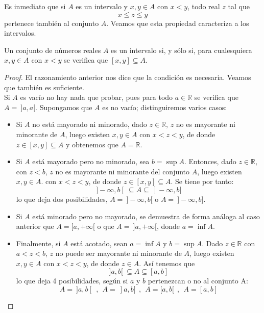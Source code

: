 Es inmediato que si $A$ es un intervalo y $x,y \in A$ con $x < y$, todo real $z$ tal que
\begin{equation*}
    x \leq z \leq y
\end{equation*}
pertenece también al conjunto $A$. Veamos que esta propiedad caracteriza a los intervalos.

\begin{teo}\label{prop:12.5.2}
    Un conjunto de números reales $A$ es un intervalo si, y sólo si, para cualesquiera $x,y \in A$ con $x < y$ se verifica que $[x,y] \subseteq A$.
\end{teo}
\begin{proof}
    El razonamiento anterior nos dice que la condición es necesaria. Veamos que también es suficiente.\\
    
    Si $A$ es vacío no hay nada que probar, pues para todo $a \in \mathbb{R}$ se verifica que $A = ~  ]a,a[$.
    Supongamos que $A$ es no vacío; distinguiremos varios casos:
    \begin{itemize}
        \item Si $A$ no está mayorado ni minorado, dado $z \in \mathbb{R}$, $z$ no es mayorante ni minorante de $A$, luego existen $x,y \in A$ con $x < z < y$, de donde $z \in [x,y] \subseteq A$ y obtenemos que $A=\mathbb{R}$.

        \item Si $A$ está mayorado pero no minorado, sea $b = \sup A$. Entonces, dado $z \in \mathbb{R}$, con $z < b$,
        $z$ no es mayorante ni minorante del conjunto $A$, luego existen $x,y \in A$. con $x < z < y$, de donde
        $z \in [x,y] \subseteq A$. Se tiene por tanto:
        \begin{equation*}
            ]-\infty, b[ ~ \subseteq A \subseteq ~ ]-\infty, b]
        \end{equation*}
        lo que deja dos posibilidades, $A = ~ ]-\infty, b[$ o $A = ~ ]-\infty, b]$.

        \item Si $A$ está minorado pero no mayorado, se demuestra de forma análoga al caso anterior que $A = [a, +\infty[$ o que $A = ~ ]a, +\infty[$, donde $a = \inf A$.

        \item Finalmente, si $A$ está acotado, sean $a = \inf A$ y $b = \sup A$. Dado $z \in \mathbb{R}$ con
        $a < z < b$, $z$ no puede ser mayorante ni minorante de $A$, luego existen $x,y \in A$ con $x < z < y$,
        de donde $z \in A$. Así tenemos que
        \begin{equation*}
        ]a,b[ ~ \subseteq A \subseteq [a,b]
        \end{equation*}
        lo que deja 4 posibilidades, según si $a$ y $b$ pertenezcan o no al conjunto A:
        \begin{equation*}
            A = ~ ]a,b[ ~~, ~~ A = ~ ]a,b] ~~, ~~ A = [a,b[ ~~, ~~ A = [a,b]
        \end{equation*}
    \end{itemize}
\end{proof}


